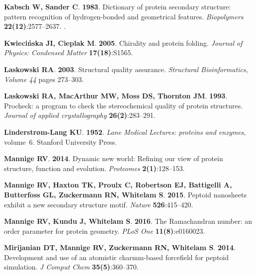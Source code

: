 \documentclass[fleqn,10pt,lineno]{wlpeerj} %
\begin{document}
\begin{thebibliography}{58}
\textbf{Kabsch W, Sander C}. \textbf{1983}.
\newblock Dictionary of protein secondary structure: pattern recognition of
  hydrogen-bonded and geometrical features.
\newblock \emph{Biopolymers} \textbf{22(12)}:2577--2637.
\newblock {}.

\textbf{Kwieci{\'n}ska JI, Cieplak M}. \textbf{2005}.
\newblock Chirality and protein folding.
\newblock \emph{Journal of Physics: Condensed Matter} \textbf{17(18)}:S1565.

\textbf{Laskowski RA}. \textbf{2003}.
\newblock Structural quality assurance.
\newblock \emph{Structural Bioinformatics, Volume 44} pages 273--303.

\textbf{Laskowski RA, MacArthur MW, Moss DS, Thornton JM}. \textbf{1993}.
\newblock Procheck: a program to check the stereochemical quality of protein
  structures.
\newblock \emph{Journal of applied crystallography} \textbf{26(2)}:283--291.

\textbf{Linderstr{\o}m-Lang KU}. \textbf{1952}.
\newblock \emph{Lane Medical Lectures: proteins and enzymes}, volume~6.
\newblock Stanford University Press.

\textbf{Mannige RV}. \textbf{2014}.
\newblock Dynamic new world: Refining our view of protein structure, function
  and evolution.
\newblock \emph{Proteomes} \textbf{2(1)}:128--153.

\textbf{Mannige RV, Haxton TK, Proulx C, Robertson EJ, Battigelli A, Butterfoss
  GL, Zuckermann RN, Whitelam S}. \textbf{2015}.
\newblock Peptoid nanosheets exhibit a new secondary structure motif.
\newblock \emph{Nature} \textbf{526}:415--420.

\textbf{Mannige RV, Kundu J, Whitelam S}. \textbf{2016}.
\newblock The {R}amachandran number: an order parameter for protein geometry.
\newblock \emph{PLoS One} \textbf{11(8)}:e0160023.

\textbf{Mirijanian DT, Mannige RV, Zuckermann RN, Whitelam S}. \textbf{2014}.
\newblock Development and use of an atomistic charmm-based forcefield for
  peptoid simulation.
\newblock \emph{J Comput Chem} \textbf{35(5)}:360--370.


\end{thebibliography}
\end{document}
